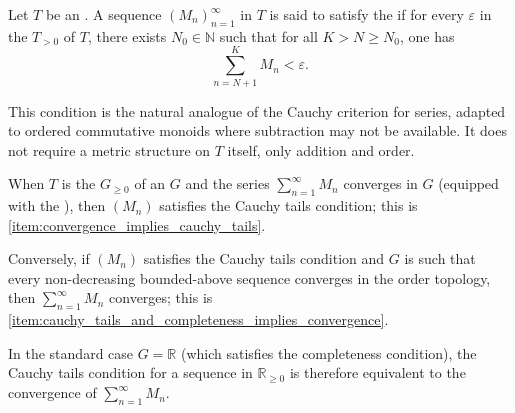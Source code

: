 \begin{definition} \label{definition:cauchy_tails_condition_for_series_in_an_ordered_semiring}
    Let $T$ be an . A sequence $(M_n)_{n=1}^\infty$ in $T$ is said to satisfy the  if for every $\varepsilon$ in the  $T_{>0}$ of $T$, there exists $N_0 \in \mathbb{N}$ such that for all $K > N \ge N_0$, one has
    $$\sum_{n=N+1}^K M_n < \varepsilon.$$

    This condition is the natural analogue of the Cauchy criterion for series, adapted to ordered commutative monoids where subtraction may not be available. It does not require a metric structure on $T$ itself, only addition and order.

    When $T$ is the  $G_{\ge 0}$ of an  $G$ and the series $\sum_{n=1}^\infty M_n$ converges in $G$ (equipped with the ), then $(M_n)$ satisfies the Cauchy tails condition; this is \eqref{item:convergence_implies_cauchy_tails}.

    Conversely, if $(M_n)$ satisfies the Cauchy tails condition and $G$ is such that every non-decreasing bounded-above sequence converges in the order topology, then $\sum_{n=1}^\infty M_n$ converges; this is \eqref{item:cauchy_tails_and_completeness_implies_convergence}.

    In the standard case $G = \mathbb{R}$ (which satisfies the completeness condition), the Cauchy tails condition for a sequence in $\mathbb{R}_{\ge 0}$ is therefore equivalent to the convergence of $\sum_{n=1}^\infty M_n$.
\end{definition}